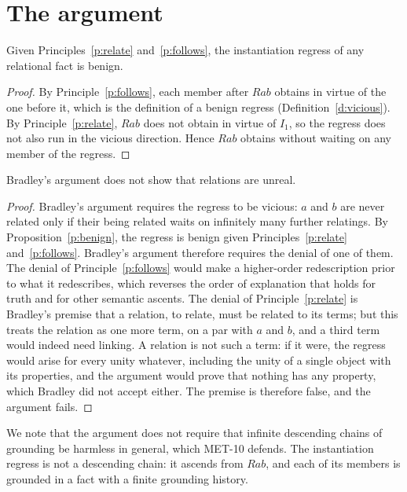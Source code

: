 \documentclass{situationist-preprint}
\begin{document}
\section{The argument}

\begin{proposition}\label{p:benign}
Given Principles~\ref{p:relate} and~\ref{p:follows}, the instantiation regress of any relational fact is benign.
\end{proposition}

\begin{proof}
By Principle~\ref{p:follows}, each member after $Rab$ obtains in virtue of the one before it, which is the definition of a benign regress (Definition~\ref{d:vicious}). By Principle~\ref{p:relate}, $Rab$ does not obtain in virtue of $I_1$, so the regress does not also run in the vicious direction. Hence $Rab$ obtains without waiting on any member of the regress.
\end{proof}

\begin{theorem}\label{t:main}
Bradley's argument does not show that relations are unreal.
\end{theorem}

\begin{proof}
Bradley's argument requires the regress to be vicious: $a$ and $b$ are never related only if their being related waits on infinitely many further relatings. By Proposition~\ref{p:benign}, the regress is benign given Principles~\ref{p:relate} and~\ref{p:follows}. Bradley's argument therefore requires the denial of one of them. The denial of Principle~\ref{p:follows} would make a higher-order redescription prior to what it redescribes, which reverses the order of explanation that holds for truth and for other semantic ascents. The denial of Principle~\ref{p:relate} is Bradley's premise that a relation, to relate, must be related to its terms; but this treats the relation as one more term, on a par with $a$ and $b$, and a third term would indeed need linking. A relation is not such a term: if it were, the regress would arise for every unity whatever, including the unity of a single object with its properties, and the argument would prove that nothing has any property, which Bradley did not accept either. The premise is therefore false, and the argument fails.
\end{proof}

We note that the argument does not require that infinite descending chains of grounding be harmless in general, which MET-10 defends. The instantiation regress is not a descending chain: it ascends from $Rab$, and each of its members is grounded in a fact with a finite grounding history.
\end{document}
